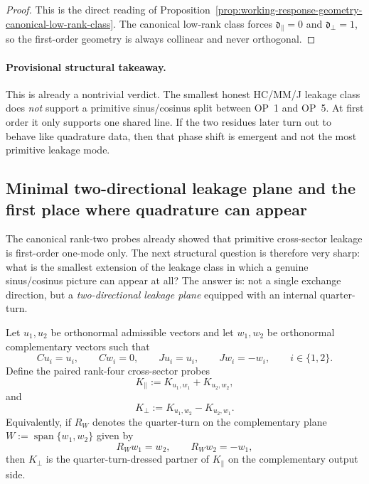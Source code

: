 \begin{proof}
This is the direct reading of Proposition~\ref{prop:working-response-geometry-canonical-low-rank-class}. The canonical low-rank class forces $\mathfrak d_{\parallel}=0$ and $\mathfrak d_{\perp}=1$, so the first-order geometry is always collinear and never orthogonal.
\end{proof}

\paragraph{Provisional structural takeaway.}
This is already a nontrivial verdict. The smallest honest HC/MM/J leakage class does \emph{not} support a primitive sinus/cosinus split between OP~1 and OP~5. At first order it only supports one shared line. If the two residues later turn out to behave like quadrature data, then that phase shift is emergent and not the most primitive leakage mode.

\subsection*{Minimal two-directional leakage plane and the first place where quadrature can appear}
The canonical rank-two probes already showed that primitive cross-sector leakage is first-order one-mode only. The next structural question is therefore very sharp: what is the smallest extension of the leakage class in which a genuine sinus/cosinus picture can appear at all? The answer is: not a single exchange direction, but a \emph{two-directional leakage plane} equipped with an internal quarter-turn.

\begin{definition}
\label{def:working-minimal-two-directional-leakage-plane}
Let $u_1,u_2$ be orthonormal admissible vectors and let $w_1,w_2$ be orthonormal complementary vectors such that
\[
  Cu_i=u_i,
  \qquad
  Cw_i=0,
  \qquad
  Ju_i=u_i,
  \qquad
  Jw_i=-w_i,
  \qquad i\in\{1,2\}.
\]
Define the paired rank-four cross-sector probes
\[
  K_{\parallel} := K_{u_1,w_1}+K_{u_2,w_2},
\]
and
\[
  K_{\perp} := K_{u_1,w_2}-K_{u_2,w_1}.
\]
Equivalently, if $R_W$ denotes the quarter-turn on the complementary plane $W:=\operatorname{span}\{w_1,w_2\}$ given by
\[
  R_W w_1=w_2,
  \qquad
  R_W w_2=-w_1,
\]
then $K_{\perp}$ is the quarter-turn-dressed partner of $K_{\parallel}$ on the complementary output side.
\end{definition}

